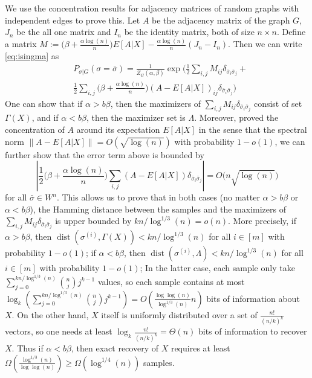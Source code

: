 \label{key}\documentclass[conference]{IEEEtran}
\newcommand{\ide}[2]{ \delta_{#1 #2} }
\DeclareMathOperator{\dist}{dist}
\begin{document}
We use the concentration results for adjacency matrices of random graphs with independent edges to prove this.
Let $A$ be the adjacency matrix of the graph $G$, $J_n$ be the all one matrix and $I_n$ be the identity matrix, both of size $n\times n$.
Define a matrix
$
M:= \big(\beta+\frac{\alpha\log(n)}{n} \big) E[A|X]
-\frac{\alpha\log(n)}{n} (J_n-I_n).
$
Then we can write \eqref{eq:isingma}
as
\begin{align*}
&P_{\sigma|G}(\sigma=\bar{\sigma})
= \frac{1}{Z_G(\alpha,\beta)}
\exp\Big( \frac{1}{2} \sum_{i,j} M_{ij} \ide{\bar{\sigma}_i}{\bar{\sigma}_j} + \\
& \frac{1}{2} \sum_{i,j}\big(\beta+\frac{\alpha\log(n)}{n} \big)  (A-E[A|X])_{ij} \ide{\bar{\sigma}_i}{\bar{\sigma}_j}
\Big)
\end{align*}
One can show that if $\alpha>b\beta$, then the maximizers of $\sum_{i,j} M_{ij} \ide{\bar{\sigma}_i}{\bar{\sigma}_j}$ consist of set $\Gamma(X)$, and if $\alpha<b\beta$, then the maximizer set is $\Lambda$.
Moreover, \cite{Hajek16} proved the concentration of $A$ around its expectation $E[A|X]$ in the sense that
the spectral norm $\|A-E[A|X]\| = O(\sqrt{\log(n)})$ with probability $1-o(1)$, we can further show that the error term above is bounded by
$$
\left|\frac{1}{2} \big(\beta+\frac{\alpha\log(n)}{n} \big)\sum_{i,j} (A-E[A|X])
  \ide{\bar{\sigma}_i}{\bar{\sigma}_j} \right| = O \big( n \sqrt{\log(n)} \big)
$$
for all $\bar{\sigma}\in W^n$.
This allows us to prove that in both cases (no matter $\alpha>b\beta$ or $\alpha<b\beta$), the Hamming distance between the samples and the maximizers of $\sum_{i,j}  M_{ij} \ide{\bar{\sigma}_i}{\bar{\sigma}_j}$ is upper bounded by $kn/\log^{1/3}(n)=o(n)$.
More precisely, if $\alpha>b\beta$, then $\dist(\sigma^{(i)},\Gamma(X) )< kn/\log^{1/3}(n)$ for all $i\in[m]$ with probability $1-o(1)$;
if $\alpha<b\beta$, then $\dist(\sigma^{(i)}, \Lambda)< kn/\log^{1/3}(n)$ for all $i\in[m]$ with probability $1-o(1)$;
In the latter case, each sample only take $\sum_{j=0}^{kn/\log^{1/3}(n)}\binom{n}{j}j^{k-1}$ values, so each sample contains at most $\log_k(\sum_{j=0}^{kn/\log^{1/3}(n)}\binom{n}{j}j^{k-1})=O(\frac{\log\log(n)}{\log^{1/3}(n)} n)$ bits of information about $X$. On the other hand, $X$ itself is uniformly distributed over a set of $\frac{n!}{(n/k)^k}$ vectors, so one needs at least $\log_k\frac{n!}{(n/k)^k}=\Theta(n)$ bits of information to recover $X$. Thus if $\alpha<b\beta$, then exact recovery of $X$ requires at least $\Omega(\frac{\log^{1/3}(n)}{\log\log(n)})\ge \Omega(\log^{1/4}(n))$ samples.
\end{document}
